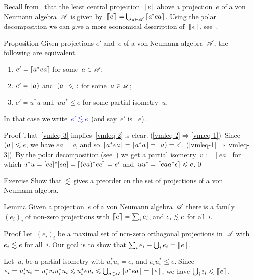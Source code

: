 \documentclass[a]{subfiles}
\begin{document}
\begin{parsec}%
\begin{point}%
Recall from~
that the least central projection~$\left\lceil\!\!\left\lceil e\right\rceil\!\!\right\rceil$
above a projection~$e$ of a von Neumann algebra~$\mathscr{A}$
is given by~$\left\lceil\!\!\left\lceil e\right\rceil\!\!\right\rceil=\bigcup_{a\in \mathscr{A}}\left\lceil a^* e a\right\rceil$.
Using the polar decomposition
we can give a more economical
description of~$\left\lceil\!\!\left\lceil e\right\rceil\!\!\right\rceil$,
see~.
\end{point}
\begin{point}[vmleq]{Proposition}%
Given projections $e'$ and~$e$
of a von Neumann algebra~$\mathscr{A}$,
the following are equivalent.
\begin{enumerate}
\item
\label{vmleq-1}
$e'= \left\lceil a^*e a\right\rceil$ for some~$a\in\mathscr{A}$;
\item
\label{vmleq-2}
$e' = \left\lceil a\right)$ and~$\left(a\right\rceil\leqslant e$
for some~$a\in\mathscr{A}$;
\item
\label{vmleq-3}
$e' = u^*u$ and~$uu^*\leq e$
for some partial isometry~$u$.
\end{enumerate}
In that case
we write~$\Define{e'\vmleq e}$
(and say~$e'$ is ~$e$).
\begin{point}{Proof}%
That~\ref{vmleq-3}
implies~\ref{vmleq-2} is clear.
(\ref{vmleq-2}$\Rightarrow$\ref{vmleq-1})\ 
Since~$\left(a\right\rceil\leqslant e$,
we have $ea=a$,
and so~$\left\lceil a^*ea\right\rceil=\left\lceil a^*a\right\rceil=\left\lceil a\right)=e'$.
(\ref{vmleq-1}$\Rightarrow$\ref{vmleq-3})\ 
By the polar decomposition (see~)
we get a partial isometry~$u:=[ea]$
for which $u^*u = [ea]^*[ea]=\left\lceil(ea)^*ea\right\rceil=e'$
and~$uu^*=\left\lceil eaa^*e\right\rceil\leqslant e$.\qed
\end{point}
\end{point}
\begin{point}{Exercise}%
Show that~$\vmleq$ gives a preorder
on the set of projections of a von Neumann algebra.
\end{point}
\begin{point}{Lemma}%
Given a projection~$e$
of a von Neumann algebra~$\mathscr{A}$
there is a family
$(e_i)_i$ of non-zero projections with $\left\lceil\!\!\left\lceil e\right\rceil\!\!\right\rceil=\sum_i e_i$,
and $e_i\vmleq e$ for all~$i$.
\begin{point}{Proof}%
Let~$(e_i)_i$
be a maximal set of non-zero orthogonal projections
in~$\mathscr{A}$ with
$e_i\vmleq e$ for all~$i$.
Our goal is to show that $\sum_i e_i \equiv \bigcup_i e_i=\left\lceil\!\!\left\lceil e\right\rceil\!\!\right\rceil$.

Let~$u_i$ be a partial isometry
with $u_i^*u_i=e_i$ and $u_iu_i^* \leq e$.
Since $e_i=u_i^* u_i = u_i^* u_i u_i^* u_i
\leqslant u_i^* e u_i 
\leqslant \bigcup_{a\in \mathscr{A}} \left\lceil a^* e a\right\rceil=\left\lceil\!\!\left\lceil e\right\rceil\!\!\right\rceil$,
we have
$\bigcup_i e_i \leqslant \left\lceil\!\!\left\lceil e\right\rceil\!\!\right\rceil$.


\end{point}
\end{point}
\end{parsec}
\end{document}
